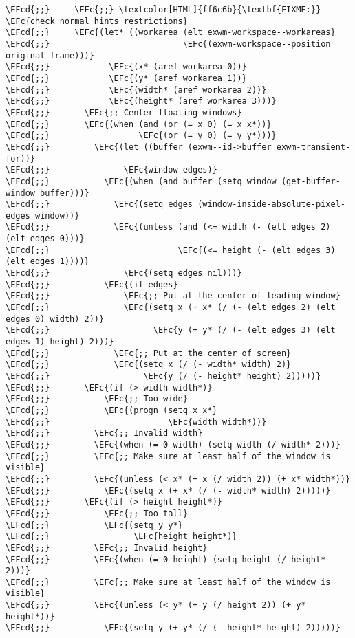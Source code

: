 \documentclass[a4wide,10pt]{article}
\newcommand{\EFc}[1]{\textcolor{EFc}{#1}} %
\newcommand{\EFcd}[1]{\textcolor{EFcd}{#1}} %
\begin{document}
\begin{Code}
\begin{Verbatim}
\EFcd{;;}     \EFc{;;} \textcolor[HTML]{ff6c6b}{\textbf{FIXME:}} \EFc{check normal hints restrictions}
\EFcd{;;}     \EFc{(let* ((workarea (elt exwm-workspace--workareas}
\EFcd{;;}                           \EFc{(exwm-workspace--position original-frame)))}
\EFcd{;;}            \EFc{(x* (aref workarea 0))}
\EFcd{;;}            \EFc{(y* (aref workarea 1))}
\EFcd{;;}            \EFc{(width* (aref workarea 2))}
\EFcd{;;}            \EFc{(height* (aref workarea 3)))}
\EFcd{;;}       \EFc{;; Center floating windows}
\EFcd{;;}       \EFc{(when (and (or (= x 0) (= x x*))}
\EFcd{;;}                  \EFc{(or (= y 0) (= y y*)))}
\EFcd{;;}         \EFc{(let ((buffer (exwm--id->buffer exwm-transient-for))}
\EFcd{;;}               \EFc{window edges)}
\EFcd{;;}           \EFc{(when (and buffer (setq window (get-buffer-window buffer)))}
\EFcd{;;}             \EFc{(setq edges (window-inside-absolute-pixel-edges window))}
\EFcd{;;}             \EFc{(unless (and (<= width (- (elt edges 2) (elt edges 0)))}
\EFcd{;;}                          \EFc{(<= height (- (elt edges 3) (elt edges 1))))}
\EFcd{;;}               \EFc{(setq edges nil)))}
\EFcd{;;}           \EFc{(if edges}
\EFcd{;;}               \EFc{;; Put at the center of leading window}
\EFcd{;;}               \EFc{(setq x (+ x* (/ (- (elt edges 2) (elt edges 0) width) 2))}
\EFcd{;;}                     \EFc{y (+ y* (/ (- (elt edges 3) (elt edges 1) height) 2)))}
\EFcd{;;}             \EFc{;; Put at the center of screen}
\EFcd{;;}             \EFc{(setq x (/ (- width* width) 2)}
\EFcd{;;}                   \EFc{y (/ (- height* height) 2)))))}
\EFcd{;;}       \EFc{(if (> width width*)}
\EFcd{;;}           \EFc{;; Too wide}
\EFcd{;;}           \EFc{(progn (setq x x*}
\EFcd{;;}                        \EFc{width width*))}
\EFcd{;;}         \EFc{;; Invalid width}
\EFcd{;;}         \EFc{(when (= 0 width) (setq width (/ width* 2)))}
\EFcd{;;}         \EFc{;; Make sure at least half of the window is visible}
\EFcd{;;}         \EFc{(unless (< x* (+ x (/ width 2)) (+ x* width*))}
\EFcd{;;}           \EFc{(setq x (+ x* (/ (- width* width) 2)))))}
\EFcd{;;}       \EFc{(if (> height height*)}
\EFcd{;;}           \EFc{;; Too tall}
\EFcd{;;}           \EFc{(setq y y*}
\EFcd{;;}                 \EFc{height height*)}
\EFcd{;;}         \EFc{;; Invalid height}
\EFcd{;;}         \EFc{(when (= 0 height) (setq height (/ height* 2)))}
\EFcd{;;}         \EFc{;; Make sure at least half of the window is visible}
\EFcd{;;}         \EFc{(unless (< y* (+ y (/ height 2)) (+ y* height*))}
\EFcd{;;}           \EFc{(setq y (+ y* (/ (- height* height) 2)))))}

\end{Verbatim}
\end{Code}
\end{document}
